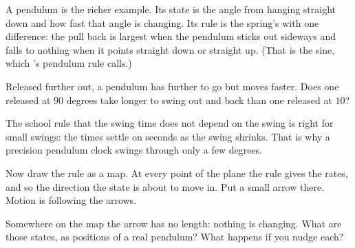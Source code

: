 A pendulum is the richer example. Its state is the angle from hanging
straight down and how fast that angle is changing. Its rule is the spring's
with one difference: the pull back is largest when the pendulum sticks out
sideways and falls to nothing when it points straight down or straight up.
(That is the sine, which 's pendulum rule calls.)

\begin{think}
Released further out, a pendulum has further to go but moves faster. Does
one released at $90$ degrees take longer to swing out and back than one
released at $10$?
\end{think}



\noindent
The school rule that the swing time does not depend on the swing is right for
small swings: the times settle on  seconds as the swing
shrinks. That is why a precision pendulum clock swings through only a few
degrees.

Now draw the rule as a map. At every point of the plane the rule gives the
rates, and so the direction the state is about to move in. Put a small arrow
there. Motion is following the arrows.

\begin{think}
Somewhere on the map the arrow has no length: nothing is changing. What are
those states, as positions of a real pendulum? What happens if you nudge
each?
\end{think}



